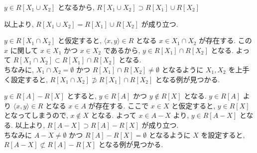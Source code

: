 \begin{nmprob}
{\begin{enumerate}
$y \in R[X_1 \cup X_2]$ となるから, $R[X_1 \cup X_2] \supset R[X_1] \cup R[X_2]$
\end{enumerate}
以上より, $R[X_1 \cup X_2] = R[X_1] \cup R[X_2]$ が成り立つ.
\item $y \in R[X_1 \cap X_2]$ と仮定すると, $\langle x, y\rangle \in R$ となる $x \in X_1 \cap X_2$ が存在する. この $x$ に関して $x \in X_1$ かつ $x \in X_2$ であるから, $y \in R[X_1] \cap R[X_2]$ となる.
よって $R[X_1 \cap X_2] \subset R[X_1] \cap R[X_2]$ となる. \\
ちなみに, $X_1 \cap X_2 = \emptyset$ かつ $R[X_1] \cap R[X_2] \neq \emptyset$ となるように $X_1, X_2$ を上手く設定すると, $R[X_1 \cap X_2] \not\supset R[X_1] \cap R[X_2]$ となる例が見つかる.
\item $y \in R[A] - R[X]$ とすると, $y \in R[A]$ かつ $y \notin R[X]$ となる. $y \in R[A]$ より $\langle x, y\rangle \in R$ となる $x \in A$ が存在する. ここで $x \in X$ と仮定すると, $y \in R[X]$ となってしまうので, $x \notin X$ となる.
よって $x \in A - X$ より, $y \in R[A - X]$ となる. 以上より, $R[A - X] \supset R[A] - R[X]$ が成り立つ.\\
ちなみに $A - X \neq \emptyset$ かつ $R[A] - R[X] = \emptyset$ となるように $X$ を設定すると, $R[A - X] \not\subset R[A] - R[X]$ となる例が見つかる.
}
\end{nmprob}



